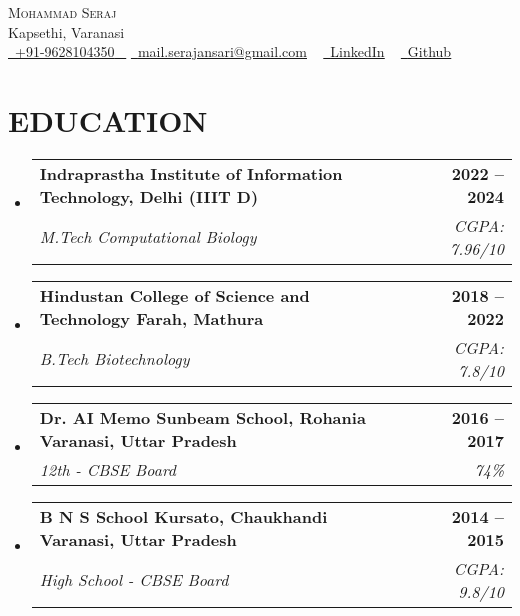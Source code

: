 \documentclass[letterpaper,11pt]{article}
\makeatletter
\newcommand{\resumeSubheading}[4]{
  \vspace{-2pt}\item
    \begin{tabular*}{1.0\textwidth}[t]{l@{\extracolsep{\fill}}r}
      \textbf{\large#1} & \textbf{\small #2} \\
      \textit{\large#3} & \textit{\small #4} \\
    \end{tabular*}\vspace{-7pt}
}
\newcommand{\resumeSubHeadingListStart}{\begin{itemize}[leftmargin=0.0in, label={}]}
\newcommand{\resumeSubHeadingListEnd}{\end{itemize}}
\makeatother
\begin{document}

\begin{center}
    {\Huge \scshape Mohammad Seraj} \\ \vspace{1pt}
    Kapsethi, Varanasi \\ \vspace{1pt}
    \small \href{tel:#}{\raisebox{-0.1\height}{\faPhone}\ \underline{+91-9628104350} ~} \href{mailto:yourname@gmail.com}{\raisebox{-0.2\height}{\faEnvelope}\ \underline{mail.serajansari@gmail.com}} ~ 
\href{https://www.linkedin.com/in/ansariserajmd/}{\raisebox{-0.2\height}{\faLinkedin}\ \underline{LinkedIn}} ~
    \href{https://github.com/mohammadserajansari}{\raisebox{-0.2\height}{\faGithub}\ \underline{Github}} ~

\end{center}
\vspace{0.5mm}

\section{EDUCATION}
\resumeSubHeadingListStart
    \resumeSubheading
    {Indraprastha Institute of Information Technology, Delhi (IIIT D)}{2022 – 2024}
    {M.Tech Computational Biology}{CGPA: 7.96/10}
    \resumeSubheading
    {Hindustan College of Science and Technology Farah, Mathura}{2018 – 2022}
    {B.Tech Biotechnology}{CGPA: 7.8/10}
    \resumeSubheading
    {Dr. AI Memo Sunbeam School, Rohania Varanasi, Uttar Pradesh}{2016 – 2017}
    {12th - CBSE Board}{74\%}
    \resumeSubheading
    {B N S School Kursato, Chaukhandi Varanasi, Uttar Pradesh}{2014 – 2015}
    {High School - CBSE Board}{CGPA: 9.8/10}
\resumeSubHeadingListEnd

\end{document}
